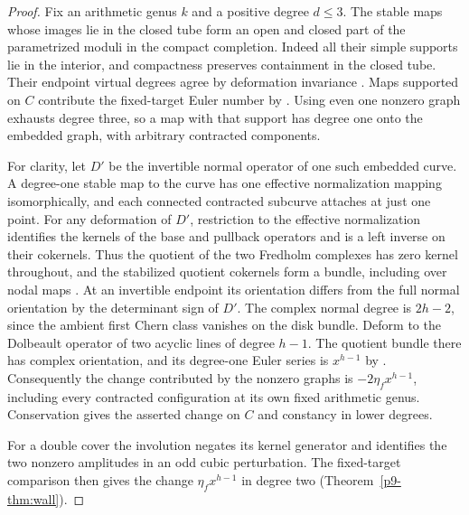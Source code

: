 \begin{proof}
Fix an arithmetic genus $k$ and a positive degree $d\le3$. The
stable maps whose images lie in the closed tube form an open and
closed part of the parametrized moduli in the compact completion.
Indeed all their simple supports lie in the interior, and compactness
preserves containment in the closed tube. Their endpoint virtual
degrees agree by deformation invariance
\cite[\S3.1, (3.4)--(3.5)]{diw}. Maps supported on $C$ contribute
the fixed-target Euler number by
\cite[Theorem~1.2, (1.7) and~(1.10)]{zinger}. Using even one nonzero graph
exhausts degree three, so a map with that support has degree one onto
the embedded graph, with arbitrary contracted components.

For clarity, let $D'$ be the invertible normal operator of one such
embedded curve. A degree-one stable map to the curve has one effective
normalization mapping isomorphically, and each connected contracted
subcurve attaches at just one point. For any deformation of $D'$,
restriction to the effective normalization identifies the kernels
of the base and pullback operators and is a left inverse on their
cokernels. Thus the quotient of the two Fredholm complexes has
zero kernel throughout, and the stabilized quotient cokernels form a
bundle, including over nodal maps \cite[Appendix~B]{bai}.
At an invertible endpoint its orientation differs from the full
normal orientation by the determinant sign of $D'$. The complex
normal degree is $2h-2$, since the ambient first Chern class vanishes
on the disk bundle. Deform to the Dolbeault operator of two acyclic
lines of degree $h-1$. The quotient bundle there has complex
orientation, and its degree-one Euler series is $x^{h-1}$ by
\cite[Theorem~2]{pandhodge}. Consequently the change contributed by
the nonzero graphs is $-2\eta_f x^{h-1}$, including every contracted
configuration at its own fixed arithmetic genus. Conservation gives
the asserted change on $C$ and constancy in lower degrees.

For a double cover the involution negates its kernel generator and
identifies the two nonzero amplitudes in an odd cubic perturbation.
The fixed-target comparison then gives the change $\eta_f x^{h-1}$
in degree two (Theorem~\ref{p9-thm:wall}).
\end{proof}
